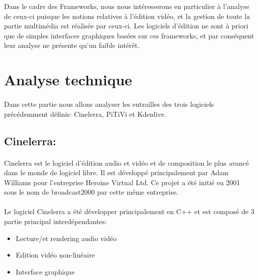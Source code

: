 Dans le cadre des Frameworks, nous nous intéresserons
en particulier à l'analyse de ceux-ci puisque les notions relatives
à l'édition vidéo, et la gestion de toute la partie multimédia est
réalisée par ceux-ci. Les logiciels d'édition ne sont à priori que
de simples interfaces graphiques basées sur ces frameworks, et par
conséquent leur analyse ne présente qu'un faible intérêt.

\newpage \section{Analyse technique}

\paragraph {}

Dans cette partie nous allons analyser les entrailles des trois logiciels précédemment
définis: Cinelerra, PiTiVi et Kdenlive.

\subsection{Cinelerra:}

\paragraph {}

Cinelerra est le logiciel d'édition audio et vidéo et de composition le plus
avancé dans le monde de logiciel libre. Il est développé principalement par
Adam Williams pour l'entreprise Heroine Virtual Ltd. Ce projet a été initié
en 2001 sous le nom de broadcast2000 par cette même entreprise.

\paragraph{}

Le logiciel Cinelerra a été développer principalement en C++ et est composé de 3 partie
principal interdépendantes:

\begin{itemize}

  \item{Lecture/et rendering audio vidéo}

  \item{Edition vidéo non-linéaire}

  \item{Interface graphique}

\end{itemize}

